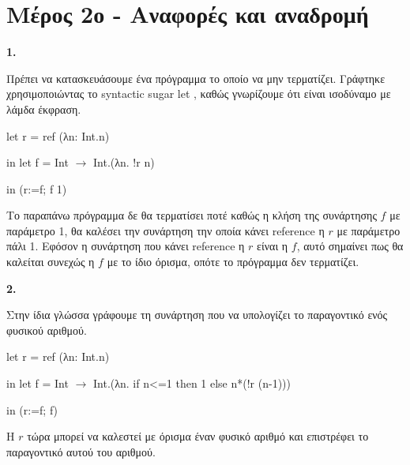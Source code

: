 \documentclass[11pt,a4paper]{report}
\begin{document}
\chapter*{Μέρος 2ο - Αναφορές και αναδρομή}
\textbf{\Large{1.}}
\par Πρέπει να κατασκευάσουμε ένα πρόγραμμα το οποίο να μην τερματίζει. Γράφτηκε χρησιμοποιώντας το \textlatin{syntactic sugar let} , καθώς γνωρίζουμε ότι είναι ισοδύναμο με λάμδα έκφραση. \\

\begin{listing}
let r = ref (λn: Int.n)

	\quad in let f = Int $\rightarrow$ Int.(λn. !r n)
	
		\quad \quad \quad in (r:=f; f 1) \\
\end{listing}

Το παραπάνω πρόγραμμα δε θα τερματίσει ποτέ καθώς η κλήση της συνάρτησης $f$ με παράμετρο 1, θα καλέσει την συνάρτηση την οποία κάνει \textlatin{reference} η $r$ με παράμετρο πάλι 1. Εφόσον η συνάρτηση που κάνει \textlatin{reference} η $r$ είναι η $f$, αυτό σημαίνει πως θα καλείται συνεχώς η $f$ με το ίδιο όρισμα, οπότε το πρόγραμμα δεν τερματίζει. \\

\par \textbf{\Large{2.}}
\par Στην ίδια γλώσσα γράφουμε τη συνάρτηση που να υπολογίζει το παραγοντικό ενός φυσικού αριθμού.\\

\begin{listing}
let r = ref (λn: Int.n)

	\quad in let f = Int $\rightarrow$ Int.(λn. if n<=1 then 1 else n*(!r (n-1)))
		
		\quad \quad \quad in (r:=f; f) \\
\end{listing}

Η $r$ τώρα μπορεί να καλεστεί με όρισμα έναν φυσικό αριθμό και επιστρέφει το παραγοντικό αυτού του αριθμού.
\end{document}
